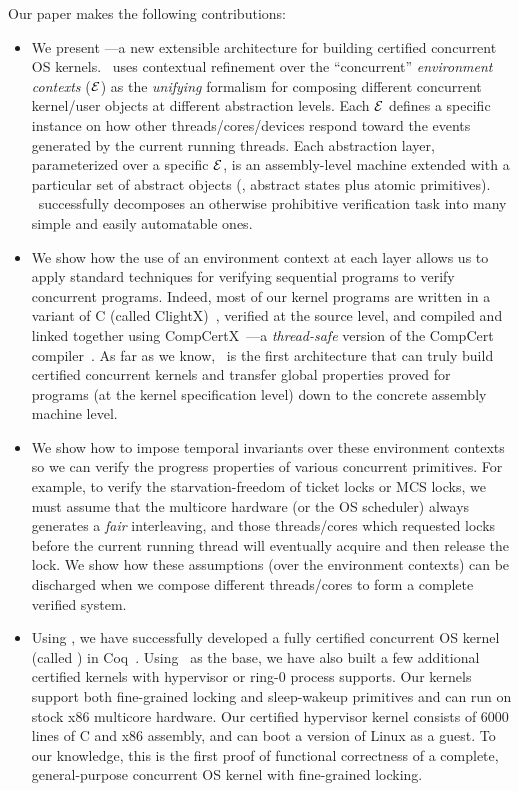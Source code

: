 Our paper makes the following contributions:
\begin{itemize} \itemsep 0pt
\item We present {\bf{}\CTOS}---a new extensible architecture for
  building certified concurrent OS kernels.  \CTOS\ uses 
  contextual refinement over the ``concurrent'' {\em environment contexts}
  ($\mathcal{E}$) as the {\em unifying} formalism for composing 
  different concurrent kernel/user objects at different
  abstraction levels.  Each $\mathcal{E}$ defines a specific instance on how
  other threads/cores/devices respond toward the events generated by
  the current running threads.  Each abstraction layer, 
  parameterized over a specific $\mathcal{E}$, is an
  assembly-level machine extended with a particular set of
  abstract objects (\ie, abstract states plus atomic primitives).
  \CTOS\ successfully decomposes an
  otherwise prohibitive verification task into many simple and easily
  automatable ones.
\item We show how the use of an environment context at each
  layer allows us to apply standard techniques for
  verifying sequential programs to verify concurrent programs.
  Indeed, most of our kernel programs are written in a variant of C
  (called ClightX)~\cite{dscal15}, verified at the source level, and
  compiled and linked together using
  CompCertX~\cite{dscal15}---a {\em thread-safe} version of the CompCert
  compiler~\cite{compcert,leroy09}. As far as we
  know, \CTOS\ is the first architecture that can truly build
  certified concurrent kernels and transfer global properties proved
  for programs (at the kernel specification level) down to the
  concrete assembly machine level.
\item We show how to impose temporal invariants over these environment
  contexts so we can verify the progress properties of various
  concurrent primitives. For example, to verify the starvation-freedom
  of ticket locks or MCS locks, we must assume that the multicore
  hardware (or the OS scheduler) always generates a {\em fair}
  interleaving, and those threads/cores which requested locks before
  the current running thread will eventually acquire and then release
  the lock. We show how these assumptions (over the environment contexts)
  can be discharged when we compose different threads/cores to form
  a complete verified system.
\item Using \CTOS, we have successfully developed a fully certified
  concurrent OS kernel (called {\bf \mCTOS}) in Coq~\cite{coq}.  Using
  \mCTOS\ as the base, we have also built a few additional certified
  kernels with hypervisor or ring-0 process supports.  Our kernels
  support both fine-grained locking and sleep-wakeup primitives and
  can run on stock x86 multicore hardware. Our certified hypervisor
  kernel consists of 6000 lines of C and x86 assembly, and can boot a
  version of Linux as a guest.
  To our knowledge, this is the
  first proof of functional correctness of a complete, general-purpose
  concurrent OS kernel with fine-grained locking.
\end{itemize}

